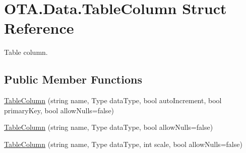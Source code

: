 \hypertarget{struct_o_t_a_1_1_data_1_1_table_column}{}\section{O\+T\+A.\+Data.\+Table\+Column Struct Reference}
\label{struct_o_t_a_1_1_data_1_1_table_column}


Table column.  


\subsection*{Public Member Functions}
\begin{DoxyCompactItemize}
\item 
\hyperlink{struct_o_t_a_1_1_data_1_1_table_column_ab84f99a400117e6a8809152b7205857e}{Table\+Column} (string name, Type data\+Type, bool auto\+Increment, bool primary\+Key, bool allow\+Nulls=false)
\item 
\hyperlink{struct_o_t_a_1_1_data_1_1_table_column_a298cf787d27d73a78bbef8fa02cd355d}{Table\+Column} (string name, Type data\+Type, bool allow\+Nulls=false)
\item 
\hyperlink{struct_o_t_a_1_1_data_1_1_table_column_a5c3c1f0d52eae5e4138e6c1698acb5bf}{Table\+Column} (string name, Type data\+Type, int scale, bool allow\+Nulls=false)
\end{DoxyCompactItemize}
